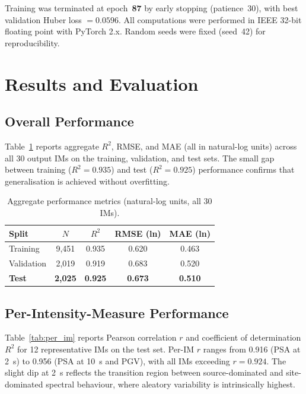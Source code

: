\documentclass[12pt,a4paper]{article}
\begin{document}
Training was terminated at epoch~\textbf{87} by early stopping (patience~30),
with best validation Huber loss $= 0.0596$.
All computations were performed in IEEE 32-bit floating point with PyTorch 2.x.
Random seeds were fixed (seed~42) for reproducibility.

\section{Results and Evaluation}
\label{sec:results}

\subsection{Overall Performance}
\label{sec:overall}

Table~\ref{tab:overall} reports aggregate $R^2$, RMSE, and MAE (all in
natural-log units) across all 30 output IMs on the training, validation, and
test sets.
The small gap between training ($R^2 = 0.935$) and test ($R^2 = 0.925$)
performance confirms that generalisation is achieved without overfitting.

\begin{table}[htbp]
\centering
\caption{Aggregate performance metrics (natural-log units, all 30 IMs).}
\label{tab:overall}
\footnotesize
\renewcommand{\arraystretch}{1.15}
\begin{tabular}{lcccc}
\toprule
Split & $N$ & $R^2$ & RMSE (ln) & MAE (ln) \\
\midrule
Training   & 9{,}451 & 0.935 & 0.620 & 0.463 \\
Validation & 2{,}019 & 0.919 & 0.683 & 0.520 \\
\textbf{Test} & \textbf{2{,}025} & \textbf{0.925} & \textbf{0.673} & \textbf{0.510} \\
\bottomrule
\end{tabular}
\end{table}

\subsection{Per-Intensity-Measure Performance}
\label{sec:per_im}

Table~\ref{tab:per_im} reports Pearson correlation $r$ and coefficient of
determination $R^2$ for 12 representative IMs on the test set.
Per-IM $r$ ranges from 0.916 (PSA at 2~s) to 0.956 (PSA at 10~s and PGV),
with all IMs exceeding $r = 0.924$.
The slight dip at 2~s reflects the transition region between source-dominated
and site-dominated spectral behaviour, where aleatory variability is
intrinsically highest.
\end{document}
